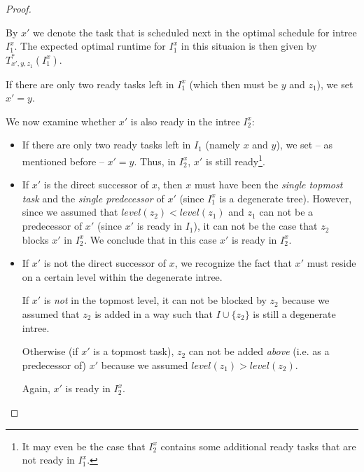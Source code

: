 \begin{proof}
\begin{itemize}
    By $x'$ we denote the task that is scheduled next in the optimal schedule for intree $I_1^x$. 
    The expected optimal runtime for $I_1^x$ in this situaion is then given by $T_{x',y,z_1}^*(I_1^x)$.

    If there are only two ready tasks left in $I_1^x$ (which then must be $y$ and $z_1$), we set $x'=y$. 

    We now examine whether $x'$ is also ready in the intree $I_2^x$:
    \begin{itemize}
    \item If there are only two ready tasks left in $I_1$ (namely $x$ and $y$), we set -- as mentioned before -- $x'=y$. Thus, in $I_2^x$, $x'$ is still ready\footnote{It may even be the case that $I_2^x$ contains some additional ready tasks that are not ready in $I_1^x$.}.
    \item If $x'$ is the direct successor of $x$, then $x$ must have been the \emph{single topmost task} and the \emph{single predecessor} of $x'$ (since $I_1^x$ is a degenerate tree). However, since we assumed that $level(z_2)<level(z_1)$ and $z_1$ can not be a predecessor of $x'$ (since $x'$ is ready in $I_1$), it can not be the case that $z_2$ blocks $x'$ in $I_2^x$. We conclude that in this case $x'$ is ready in $I_2^x$.

    \item If $x'$ is not the direct successor of $x$, we recognize the fact that $x'$ must reside on a certain level within the degenerate intree. 

      If $x'$ is \emph{not} in the topmost level, it can not be blocked by $z_2$ because we assumed that $z_2$ is added in a way such that $I\cup\{z_2\}$ is still a degenerate intree.

      Otherwise (if $x'$ is a topmost task), $z_2$ can not be added \emph{above} (i.e. as a predecessor of) $x'$ because we assumed $level(z_1)>level(z_2)$.

      Again, $x'$ is ready in $I_2^x$.


\end{itemize}
\end{itemize}
\end{proof}
